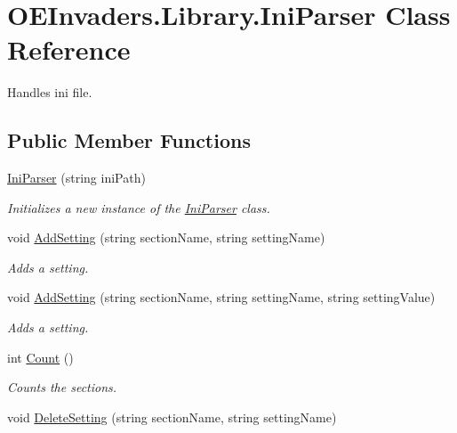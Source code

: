 \hypertarget{class_o_e_invaders_1_1_library_1_1_ini_parser}{}\section{O\+E\+Invaders.\+Library.\+Ini\+Parser Class Reference}
\label{class_o_e_invaders_1_1_library_1_1_ini_parser}


Handles ini file.  


\subsection*{Public Member Functions}
\begin{DoxyCompactItemize}
\item 
\mbox{\hyperlink{class_o_e_invaders_1_1_library_1_1_ini_parser_a3356f9debddd4725729351af23441509}{Ini\+Parser}} (string ini\+Path)
\begin{DoxyCompactList}\small\item\em Initializes a new instance of the \mbox{\hyperlink{class_o_e_invaders_1_1_library_1_1_ini_parser}{Ini\+Parser}} class. \end{DoxyCompactList}\item 
void \mbox{\hyperlink{class_o_e_invaders_1_1_library_1_1_ini_parser_a65d6a0da20cd1d220a72584d79e7ad33}{Add\+Setting}} (string section\+Name, string setting\+Name)
\begin{DoxyCompactList}\small\item\em Adds a setting. \end{DoxyCompactList}\item 
void \mbox{\hyperlink{class_o_e_invaders_1_1_library_1_1_ini_parser_a3bb2da99a04a530a7577fae8bc7ec786}{Add\+Setting}} (string section\+Name, string setting\+Name, string setting\+Value)
\begin{DoxyCompactList}\small\item\em Adds a setting. \end{DoxyCompactList}\item 
int \mbox{\hyperlink{class_o_e_invaders_1_1_library_1_1_ini_parser_a6249600db795ab959effc30ad7a05dc7}{Count}} ()
\begin{DoxyCompactList}\small\item\em Counts the sections. \end{DoxyCompactList}\item 
void \mbox{\hyperlink{class_o_e_invaders_1_1_library_1_1_ini_parser_a789776fe8a8eb9ba0f705a5f450799fd}{Delete\+Setting}} (string section\+Name, string setting\+Name)

\end{DoxyCompactItemize}
